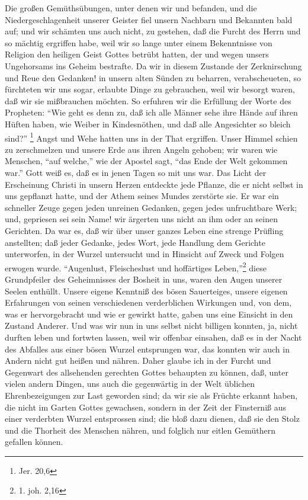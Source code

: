 Die großen Gemüthsübungen, unter denen wir und befanden, und die
Niedergeschlagenheit unserer Geister fiel unsern Nachbarn und Bekannten bald
auf; und wir schämten uns auch nicht, zu gestehen, daß die Furcht des Herrn und
so mächtig ergriffen habe, weil wir so lange unter einem Bekenntnisse von
Religion den heiligen Geist Gottes betrübt hatten, der und wegen unsers
Ungehorsams ins Geheim bestrafte. Da wir in diesem Zustande der Zerknirschung
und Reue den Gedanken! in unsern alten Sünden zu beharren, verabscheueten, so
fürchteten wir uns sogar, erlaubte Dinge zu gebrauchen, weil wir besorgt waren,
daß wir sie mißbrauchen möchten. So erfuhren wir die Erfüllung der Worte des
Propheten: "`Wie geht es denn zu, daß ich alle Männer sehe ihre Hände auf ihren
Hüften haben, wie Weiber in Kindesnöthen, und daß alle Angesichter so bleich
sind?"' \footnote{Jer. 20,6} Angst und Wehe hatten uns in der That ergriffen.
Unser Himmel schien zu zerschmelzen und unsere Erde aus ihren Angeln gehoben;
wir waren wie Menschen, "`auf welche,"' wie der Apostel sagt, "`das Ende der
Welt gekommen war."'  Gott weiß es, daß es in jenen Tagen so mit uns war. Das
Licht der Erscheinung Christi in unsern Herzen entdeckte jede Pflanze, die er
nicht selbst in uns gepflanzt hatte, und der Athem seines Mundes zerstörte sie.
Er war ein schneller Zeuge gegen jeden unreinen Gedanken, gegen jedes
unfruchtbare Werk; und, gepriesen sei sein Name! wir ärgerten uns nicht an ihm
oder an seinen Gerichten. Da war es, daß wir über unser ganzes Leben eine
strenge Prüfling anstellten; daß jeder Gedanke, jedes Wort, jede Handlung dem
Gerichte unterworfen, in der Wurzel untersucht und in Hinsicht auf Zweck und
Folgen erwogen wurde. "`Augenlust, Fleischeslust und hoffärtiges
Leben,"'\footnote{1. joh. 2,16} diese Grundpfeiler des Geheimnisses der Bosheit
in uns, waren den Augen unserer Seelen enthüllt. Unsere eigene Kenntniß des
bösen Sauerteiges, unsere eigenen Erfahrungen von seinen verschiedenen
verderblichen Wirkungen und, von dem, was er hervorgebracht und wie er gewirkt
hatte, gaben uns eine Einsicht in den Zustand Anderer. Und was wir nun in uns
selbst nicht billigen konnten, ja, nicht durften leben und fortwten lassen, weil
wir offenbar einsahen, daß es in der Nacht des Abfalles aus einer bösen Wurzel
entsprungen war, das konnten wir auch in Andern nicht gut heißen und nähren.
Daher glaube ich in der Furcht und Gegenwart des allsehenden gerechten Gottes
behaupten zu können, daß, unter vielen andern Dingen, uns auch die gegenwärtig
in der Welt üblichen Ehrenbezeigungen zur Last geworden sind; da wir sie als
Früchte erkannt haben, die nicht im Garten Gottes gewachsen, sondern in der Zeit
der Finsterniß aus einer verderbten Wurzel entsprossen sind; die bloß dazu
dienen, daß sie den Stolz und die Thorheit des Menschen nähren, und folglich nur
eitlen Gemüthern gefallen können.

